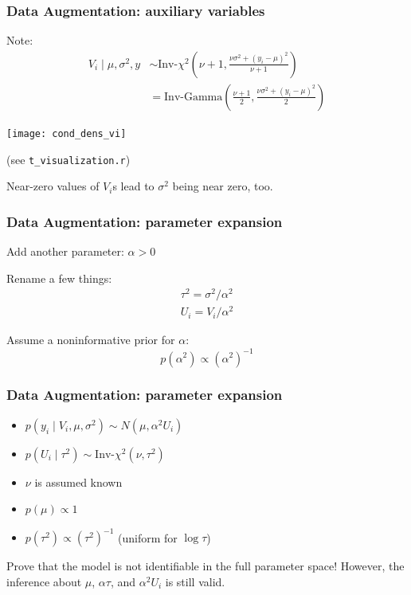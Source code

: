 \documentclass{beamer}
\begin{document}
\begin{frame}[fragile]
\frametitle{Data Augmentation: auxiliary variables}

Note:
\begin{align*}
V_i \mid \mu, \sigma^2, y &\sim \text{Inv-}\chi^2\left(\nu + 1, \frac{ \nu \sigma^2 + (y_i - \mu)^2 }{\nu+1 } \right) \\
&= \text{Inv-Gamma}\left(\frac{\nu+1}{2}, \frac{ \nu \sigma^2 + (y_i - \mu)^2 }{2 }\right)
\end{align*}

\begin{center}
\texttt{[image: cond\_dens\_vi]}
\end{center}
(see \verb|t_visualization.r|)
\newline

Near-zero values of $V_i$s lead to $\sigma^2$ being near zero, too.


\end{frame}
\begin{frame}[fragile]
\frametitle{Data Augmentation: parameter expansion}

Add another parameter: $\alpha > 0$
\newline

Rename a few things:
\begin{gather}
\tau^2 = \sigma^2/\alpha^2 \\
U_i = V_i/\alpha^2 
\end{gather}

Assume a noninformative prior for $\alpha$: 
$$
p(\alpha^2) \propto (\alpha^2)^{-1}
$$

\end{frame}


\begin{frame}
  \frametitle{Data Augmentation: parameter expansion}
\begin{itemize}
\item $p(y_i \mid V_i, \mu, \sigma^2) \sim N(\mu, \alpha^2 U_i)$
\item $p(U_i \mid \tau^2) \sim \mbox{Inv-}\chi^2(\nu,\tau^2)$   
\item $\nu$ is assumed known 
\item $p(\mu) \propto 1$ 
\item $p(\tau^2) \propto (\tau^2)^{-1}$ (uniform for $\log \tau$) 
\end{itemize}
Prove that the model is not identifiable in the full parameter space! However, the inference about $\mu$, $\alpha \tau$, and $\alpha^2U_i$ is still valid.
\end{frame}
\end{document}
